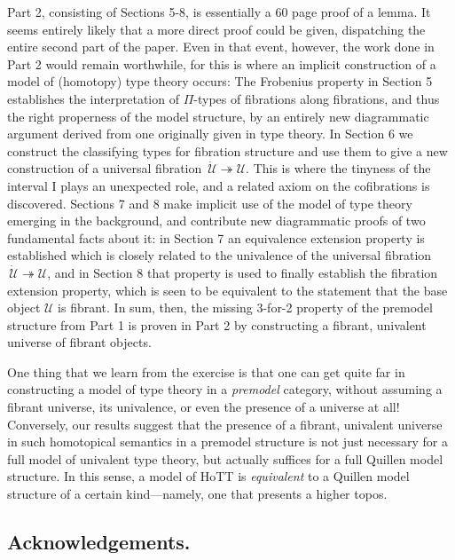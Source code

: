 \documentclass[11pt,reqno]{amsart}
\newcommand{\fib}{\ensuremath{\twoheadrightarrow}}
\newcommand{\I}{\ensuremath{\mathrm{I}}}
\newcommand{\U}{\ensuremath{\mathcal{U}}}
\newcommand{\UU}{\ensuremath{\,\dot{\mathcal{U}}}}
\theoremstyle{remark}
\theoremstyle{definition}
\begin{document}
Part 2, consisting of Sections 5-8, is essentially a 60 page proof of a lemma.  It seems entirely likely that a more direct proof could be given, dispatching the entire second part of the paper. Even in that event, however, the work done in Part 2 would remain worthwhile, for this is where an implicit construction of a model of (homotopy) type theory occurs: The Frobenius property in Section 5 establishes the interpretation of $\Pi$-types of fibrations along fibrations, and thus the right properness of the model structure, by an entirely new diagrammatic argument derived from one originally given in type theory.   In Section 6 we construct the classifying types for fibration structure and use them to give a new construction of a universal fibration $\UU\fib\U$.  This is where the tinyness of the interval $\I$ plays an unexpected role, and a related axiom on the cofibrations is discovered.
Sections 7 and 8 make implicit use of the model of type theory emerging in the background, and contribute new diagrammatic proofs of two fundamental facts about it: in Section 7 an equivalence extension property is established which is closely related to the univalence of the universal fibration $\UU\fib\U$, and in Section 8 that property is used to finally establish the fibration extension property, which is seen to be equivalent to the statement that the base object $\U$ is fibrant.  In sum, then, the missing 3-for-2 property of the premodel structure from Part 1 is proven in Part 2 by constructing a fibrant, univalent universe of fibrant objects.

One thing that we learn from the exercise is that one can get quite far in constructing a model of type theory in a \emph{premodel} category,   without assuming a fibrant universe, its univalence, or even the presence of a universe at all!  Conversely, our results suggest that the presence of a fibrant, univalent universe in such homotopical semantics in a premodel structure is not just necessary for a full model of univalent type theory, but actually suffices for a full Quillen model structure. In this sense, a model of HoTT is \emph{equivalent} to a Quillen model structure of a certain kind---namely, one that presents a higher topos.

\subsection*{Acknowledgements.}
\end{document}
